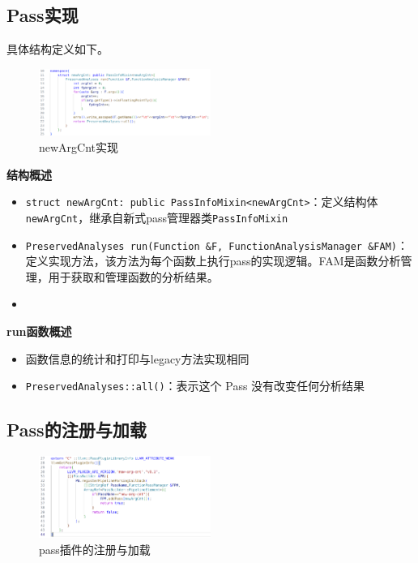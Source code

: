 \documentclass[11pt, a4paper, oneside,UTF8]{ctexart}
\begin{document}
\subsection{Pass实现}

具体结构定义如下。

\begin{figure}[h]
    \centering
    \includegraphics[width=0.5\textwidth]{./figure/new_2.png}
    \caption{newArgCnt实现}
    \label{figure:2.2}
\end{figure}

\textbf{结构概述}
\begin{itemize}[before=]
    \setlength{\itemsep}{0em}
    \item \texttt{struct newArgCnt: public PassInfoMixin<newArgCnt>}：定义结构体\texttt{newArgCnt}，继承自新式pass管理器类\texttt{PassInfoMixin}
    \item \texttt{PreservedAnalyses run(Function \&F, FunctionAnalysisManager \&FAM)}：定义实现方法，该方法为每个函数上执行pass的实现逻辑。FAM是函数分析管理，用于获取和管理函数的分析结果。
    \item \texttt{}
\end{itemize}

\textbf{run函数概述}
\begin{itemize}[before=]
    \setlength{\itemsep}{0em}
    \item 函数信息的统计和打印与legacy方法实现相同
    \item \texttt{PreservedAnalyses::all()}：表示这个 Pass 没有改变任何分析结果
\end{itemize}

\subsection{Pass的注册与加载}

\begin{figure}[h]
    \centering
    \includegraphics[width=0.5\textwidth]{./figure/new_3.png}
    \caption{pass插件的注册与加载}
    \label{figure:2.3}
\end{figure}
\end{document}
